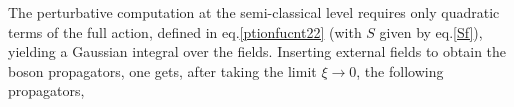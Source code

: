 The perturbative computation at the semi-classical level requires only quadratic terms of the full action, defined in eq.\eqref{ptionfucnt22} (with $S$ given by eq.\eqref{Sf}), yielding a Gaussian integral over the fields. Inserting external fields to obtain the boson propagators, one gets, after taking the limit $\xi \to 0$, the following propagators,


